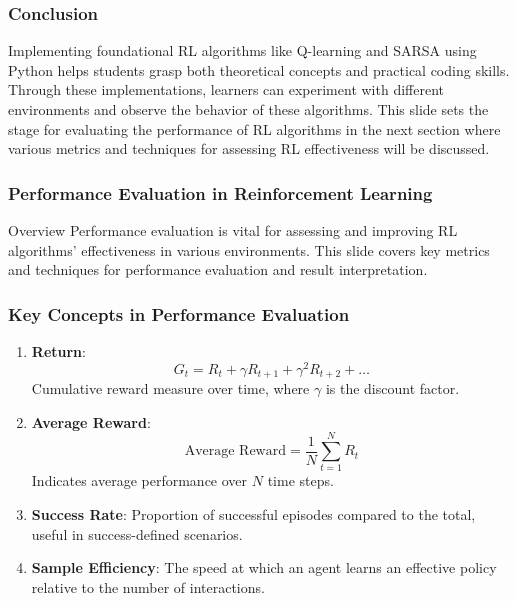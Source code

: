 \documentclass[aspectratio=169]{beamer}
\begin{document}
\begin{frame}
    \frametitle{Conclusion}
    Implementing foundational RL algorithms like Q-learning and SARSA using Python helps students grasp both theoretical concepts and practical coding skills. Through these implementations, learners can experiment with different environments and observe the behavior of these algorithms. This slide sets the stage for evaluating the performance of RL algorithms in the next section where various metrics and techniques for assessing RL effectiveness will be discussed.
\end{frame}

\begin{frame}[fragile]
    \frametitle{Performance Evaluation in Reinforcement Learning}
    \begin{block}{Overview}
        Performance evaluation is vital for assessing and improving RL algorithms' effectiveness in various environments. 
        This slide covers key metrics and techniques for performance evaluation and result interpretation.
    \end{block}
\end{frame}

\begin{frame}[fragile]
    \frametitle{Key Concepts in Performance Evaluation}
    \begin{enumerate}
        \item \textbf{Return}:
            \[
            G_t = R_t + \gamma R_{t+1} + \gamma^2 R_{t+2} + \ldots
            \]
            Cumulative reward measure over time, where \( \gamma \) is the discount factor.
        
        \item \textbf{Average Reward}:
            \[
            \text{Average Reward} = \frac{1}{N} \sum_{t=1}^{N} R_t
            \]
            Indicates average performance over \( N \) time steps.
        
        \item \textbf{Success Rate}:
            Proportion of successful episodes compared to the total, useful in success-defined scenarios.

        \item \textbf{Sample Efficiency}:
            The speed at which an agent learns an effective policy relative to the number of interactions.
    \end{enumerate}
\end{frame}
\end{document}
